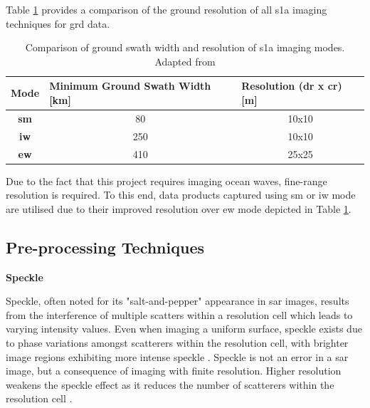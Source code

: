 Table \ref{tab:theory.s1aImagingParams} provides a comparison of the ground resolution of all \acs{s1a} imaging techniques for \acs{grd} data.

\begin{table}[H]
\centering
\begin{tabular}{|c|c|c|}
\hline
\textbf{Mode} & \multicolumn{1}{l|}{\textbf{Minimum Ground Swath Width {[}km{]}}} & \multicolumn{1}{l|}{\textbf{Resolution (dr x cr) {[}m{]}}} \\ \hline
\textbf{\acs{sm}} & 80 & 10x10 \\ \hline
\textbf{\acs{iw}} & 250 & 10x10 \\ \hline
\textbf{\acs{ew}} & 410 & 25x25 \\ \hline
\end{tabular}
\caption{Comparison of ground swath width and resolution of \acs{s1a} imaging modes. Adapted from \cite{sentinel1ProductDef}}
\label{tab:theory.s1aImagingParams}
\end{table}

Due to the fact that this project requires imaging ocean waves, fine-range resolution is required. To this end, data products captured using \acs{sm} or \acs{iw} mode are utilised due to their improved resolution over \acs{ew} mode depicted in Table \ref{tab:theory.s1aImagingParams}.






\subsection{Pre-processing Techniques} \label{subsec:theory.sar.preProcess}

\textbf{Speckle}

Speckle, often noted for its "salt-and-pepper" appearance \cite{Meyer2019} in \acs{sar} images, results from the interference of multiple scatters within a resolution cell which leads to varying intensity values. Even when imaging a uniform surface, speckle exists due to phase variations amongst scatterers within the resolution cell, with brighter image regions exhibiting more intense speckle \cite{Moreira2013,Meyer2019}. Speckle is not an error in a \acs{sar} image, but a consequence of imaging with finite resolution. Higher resolution weakens the speckle effect as it reduces the number of scatterers within the resolution 
cell \cite{Meyer2019}.

